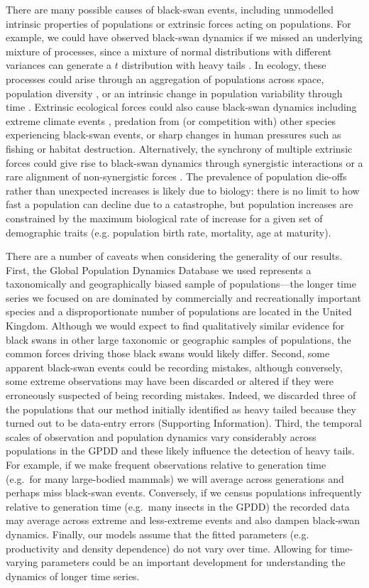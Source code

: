 \documentclass[9pt,twocolumn,twoside]{pnas-new}
\begin{document}
There are many possible causes of black-swan events, including
unmodelled intrinsic properties of populations or extrinsic forces acting on
populations. For example, we could have observed black-swan dynamics if we missed an
underlying mixture of processes, since a mixture of normal distributions with
different variances can generate a $t$ distribution with heavy
tails \cite{gelman2014}. In ecology, these processes could arise through an
aggregation of populations across space, population
diversity \cite{schindler2010}, or an intrinsic change in population variability
through time \cite{carpenter2006}. Extrinsic ecological forces could also cause
black-swan dynamics \cite{nunez2012} including extreme climate
events \cite{meehl2004, katz2005, ipcc2012}, predation from (or competition
with) other species experiencing black-swan events, or sharp changes in human
pressures such as fishing or habitat destruction.
Alternatively, the
synchrony of multiple extrinsic forces could give rise to black-swan dynamics
through synergistic interactions \cite{kirby2009} or a rare alignment of
non-synergistic forces \cite{denny2009}.
The prevalence of population die-offs rather than unexpected increases
is likely due to biology:
there is no limit to how fast a population can decline due to a catastrophe,
but population increases are constrained
by the maximum biological rate of increase
for a given set of demographic traits
(e.g. population birth rate, mortality, age at maturity).

There are a number of caveats when considering the generality of our results.
First, the Global Population Dynamics Database \cite[GPDD,][]{gpdd2010} we used
represents a taxonomically and geographically biased sample of
populations---the longer time series we focused on are dominated by commercially
and recreationally important species and a disproportionate number of
populations are located in the United Kingdom. Although we would expect to find
qualitatively similar evidence for black swans in other large taxonomic or
geographic samples of populations, the common forces driving those black swans
would likely differ. Second, some apparent black-swan events could be
recording mistakes, although conversely, some extreme observations may have been
discarded or altered if they were erroneously suspected of being recording
mistakes. Indeed, we discarded three of the populations that our method
initially identified as heavy tailed because they turned out to be data-entry
errors (Supporting Information).
Third, the temporal scales of observation and population dynamics
vary considerably across populations in the GPDD and these likely influence the
detection of heavy tails. For example, if we make frequent observations
relative to generation time (e.g.~for many large-bodied mammals) we will
average across generations and perhaps miss black-swan events. Conversely, if
we census populations infrequently relative to generation time (e.g.~many
insects in the GPDD) the recorded data may average across extreme and
less-extreme events and also dampen black-swan dynamics.
Finally, our models assume that
the fitted parameters (e.g. productivity and density dependence)
do not vary over time.
Allowing for time-varying parameters
could be an important development for
understanding the dynamics of longer time series.
\end{document}
